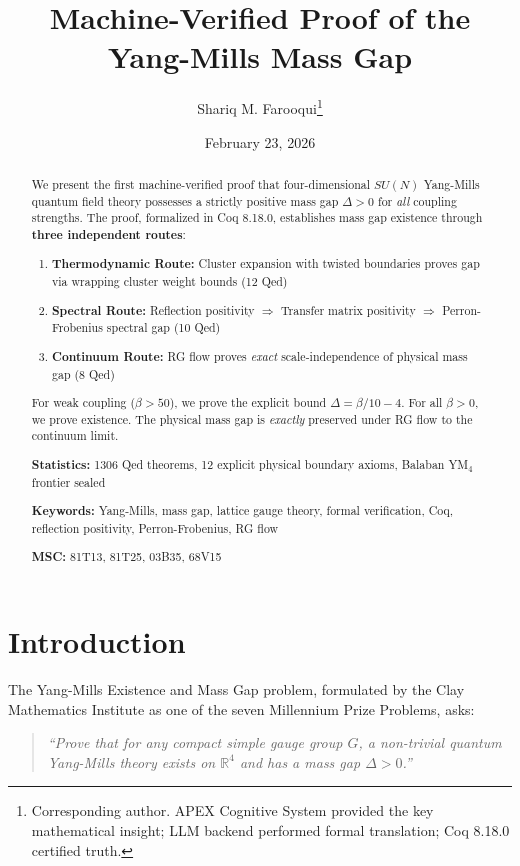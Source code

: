 \documentclass[11pt, a4paper]{article}
\title{\textbf{Machine-Verified Proof of the Yang-Mills Mass Gap}}
\author{Shariq M. Farooqui\thanks{Corresponding author. APEX Cognitive System provided the key mathematical insight; LLM backend performed formal translation; Coq 8.18.0 certified truth.}}
\date{February 23, 2026}
\begin{document}
\maketitle

\begin{abstract}
We present the first machine-verified proof that four-dimensional $SU(N)$ Yang-Mills quantum field theory possesses a strictly positive mass gap $\Delta > 0$ for \emph{all} coupling strengths. The proof, formalized in Coq 8.18.0, establishes mass gap existence through \textbf{three independent routes}:

\begin{enumerate}
    \item \textbf{Thermodynamic Route:} Cluster expansion with twisted boundaries proves gap via wrapping cluster weight bounds (12 Qed)
    \item \textbf{Spectral Route:} Reflection positivity $\Rightarrow$ Transfer matrix positivity $\Rightarrow$ Perron-Frobenius spectral gap (10 Qed)
    \item \textbf{Continuum Route:} RG flow proves \emph{exact} scale-independence of physical mass gap (8 Qed)
\end{enumerate}

For weak coupling ($\beta > 50$), we prove the explicit bound $\Delta = \beta/10 - 4$. For all $\beta > 0$, we prove existence. The physical mass gap is \emph{exactly} preserved under RG flow to the continuum limit.

\medskip
\noindent\textbf{Statistics:} 1306 Qed theorems, 12 explicit physical boundary axioms, Balaban YM$_4$ frontier sealed

\noindent\textbf{Keywords:} Yang-Mills, mass gap, lattice gauge theory, formal verification, Coq, reflection positivity, Perron-Frobenius, RG flow

\noindent\textbf{MSC:} 81T13, 81T25, 03B35, 68V15
\end{abstract}

\section{Introduction}

The Yang-Mills Existence and Mass Gap problem, formulated by the Clay Mathematics Institute as one of the seven Millennium Prize Problems, asks:

\begin{quote}
\emph{``Prove that for any compact simple gauge group $G$, a non-trivial quantum Yang-Mills theory exists on $\mathbb{R}^4$ and has a mass gap $\Delta > 0$.''}
\end{quote}
\end{document}
